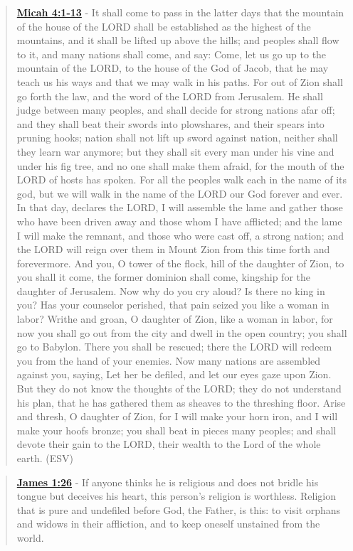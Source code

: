 \documentclass[11pt]{article}
\begin{document}
\begin{quote}
\textbf{\href{https://www.biblegateway.com/passage/?search=Micah\%204\%3A1-13\&version=ESV}{Micah 4:1-13}} - It shall come to pass in the latter days that the mountain of the house of the LORD shall be established as the highest of the mountains, and it shall be lifted up above the hills; and peoples shall flow to it, and many nations shall come, and say: Come, let us go up to the mountain of the LORD, to the house of the God of Jacob, that he may teach us his ways and that we may walk in his paths. For out of Zion shall go forth the law, and the word of the LORD from Jerusalem. He shall judge between many peoples, and shall decide for strong nations afar off; and they shall beat their swords into plowshares, and their spears into pruning hooks; nation shall not lift up sword against nation, neither shall they learn war anymore; but they shall sit every man under his vine and under his fig tree, and no one shall make them afraid, for the mouth of the LORD of hosts has spoken. For all the peoples walk each in the name of its god, but we will walk in the name of the LORD our God forever and ever. In that day, declares the LORD, I will assemble the lame and gather those who have been driven away and those whom I have afflicted; and the lame I will make the remnant, and those who were cast off, a strong nation; and the LORD will reign over them in Mount Zion from this time forth and forevermore. And you, O tower of the flock, hill of the daughter of Zion, to you shall it come, the former dominion shall come, kingship for the daughter of Jerusalem. Now why do you cry aloud? Is there no king in you? Has your counselor perished, that pain seized you like a woman in labor? Writhe and groan, O daughter of Zion, like a woman in labor, for now you shall go out from the city and dwell in the open country; you shall go to Babylon. There you shall be rescued; there the LORD will redeem you from the hand of your enemies. Now many nations are assembled against you, saying, Let her be defiled, and let our eyes gaze upon Zion. But they do not know the thoughts of the LORD; they do not understand his plan, that he has gathered them as sheaves to the threshing floor. Arise and thresh, O daughter of Zion, for I will make your horn iron, and I will make your hoofs bronze; you shall beat in pieces many peoples; and shall devote their gain to the LORD, their wealth to the Lord of the whole earth. (ESV)
\end{quote}

\begin{quote}
\textbf{\href{https://www.biblegateway.com/passage/?search=James\%201\%3A26\&version=ESV}{James 1:26}} - If anyone thinks he is religious and does not bridle his tongue but deceives his heart, this person's religion is worthless. Religion that is pure and undefiled before God, the Father, is this: to visit orphans and widows in their affliction, and to keep oneself unstained from the world.
\end{quote}
\end{document}
